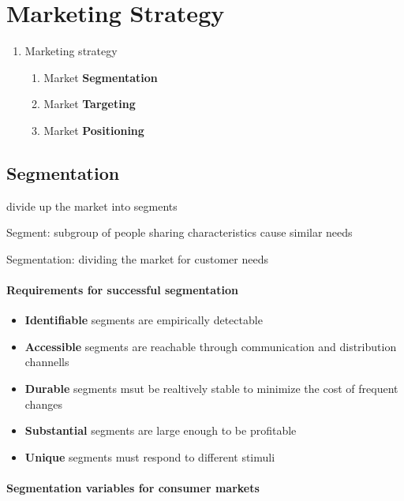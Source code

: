 \documentclass[a4paper,titlepage] {scrartcl}
\begin{document}
\section{Marketing Strategy}

\begin{enumerate}
	\item Marketing strategy
	\begin{enumerate}
		\item Market \textbf{Segmentation}
		\item Market \textbf{Targeting}
		\item Market \textbf{Positioning}
	\end{enumerate}
\end{enumerate}


\subsection{Segmentation} %
divide up the market into segments

Segment: subgroup of people sharing characteristics cause similar needs

Segmentation: dividing the market for customer needs 

\paragraph{Requirements for successful segmentation} %
\begin{itemize}
	\item \textbf{Identifiable} segments are empirically detectable
	\item \textbf{Accessible} segments are reachable through communication and distribution channells
	\item \textbf{Durable} segments msut be realtively stable to minimize the cost of frequent changes
	\item \textbf{Substantial} segments are large enough to be profitable
	\item \textbf{Unique} segments must respond to different stimuli
\end{itemize}




\paragraph{Segmentation variables for consumer markets} %
\label{par:segmentation_variables_for_consumer_markets}
\end{document}
